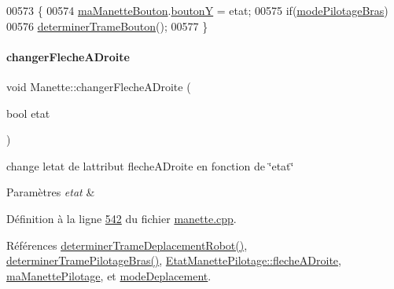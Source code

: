 \begin{DoxyCode}
00573 \{
00574     \hyperlink{class_manette_ae69fd9baa0dad8a960fa93611b6a185f}{maManetteBouton}.\hyperlink{struct_etat_manette_bouton_aae061f9e32f970787226ef9e0bdb5a17}{boutonY} = etat;
00575     \textcolor{keywordflow}{if}(\hyperlink{class_manette_acc2cd9afa45328c0da5c580e5c1a67db}{modePilotageBras})
00576         \hyperlink{class_manette_a3fb9d1245400b6bb6379fbb63a8099ba}{determinerTrameBouton}();
00577 \}
\end{DoxyCode}
\mbox{\label{class_manette_abb0ab6adafd0785d1fef58481005ac41}} 
\paragraph{\texorpdfstring{changer\+Fleche\+A\+Droite}{changerFlecheADroite}}
{\footnotesize\ttfamily void Manette\+::changer\+Fleche\+A\+Droite (\begin{DoxyParamCaption}\item[{bool}]{etat }\end{DoxyParamCaption})\hspace{0.3cm}{\ttfamily [slot]}}



change l\textquotesingle{}etat de l\textquotesingle{}attribut fleche\+A\+Droite en fonction de \char`\"{}etat\char`\"{} 


\begin{DoxyParams}{Paramètres}
{\em etat} & \\
\hline
\end{DoxyParams}


Définition à la ligne \hyperlink{manette_8cpp_source_l00542}{542} du fichier \hyperlink{manette_8cpp_source}{manette.\+cpp}.



Références \hyperlink{manette_8cpp_source_l00341}{determiner\+Trame\+Deplacement\+Robot()}, \hyperlink{manette_8cpp_source_l00375}{determiner\+Trame\+Pilotage\+Bras()}, \hyperlink{manette_8h_source_l00155}{Etat\+Manette\+Pilotage\+::fleche\+A\+Droite}, \hyperlink{manette_8h_source_l00246}{ma\+Manette\+Pilotage}, et \hyperlink{manette_8h_source_l00253}{mode\+Deplacement}.


